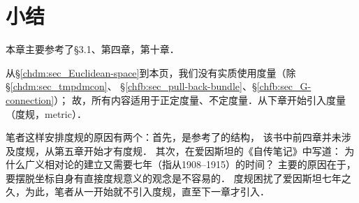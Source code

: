 \section*{小结}
本章主要参考了\parencite{cc2001-zh}\S 3.1、第四章，\parencite{chen-li-2004v2}第十章．


从\S\ref{chdm:sec_Euclidean-space}到本页，我们没有实质使用度量（除\S\ref{chdm:sec_tmpdmcon}、
\S\ref{chfb:sec_pull-back-bundle}、\S\ref{chfb:sec_G-connection}）；
故，所有内容适用于正定度量、不定度量．从下章开始引入度量（度规，metric）．

笔者这样安排度规的原因有两个：首先，是参考了\parencite{cc2001-zh}的结构，
该书中前四章并未涉及度规，从第五章开始才有度规．
其次，在爱因斯坦的《自传笔记》\parencite[p.67]{einstein-1970}中写道：
{\kaishu 为什么广义相对论的建立又需要七年（指从1908--1915）的时间？
    主要的原因在于，要摆脱坐标自身有直接度规意义的观念是不容易的．}
度规困扰了爱因斯坦七年之久，为此，笔者从一开始就不引入度规，直至下一章才引入．



\printbibliography[heading=subbibliography,title=第\ref{chfb}章参考文献]

\endinput



